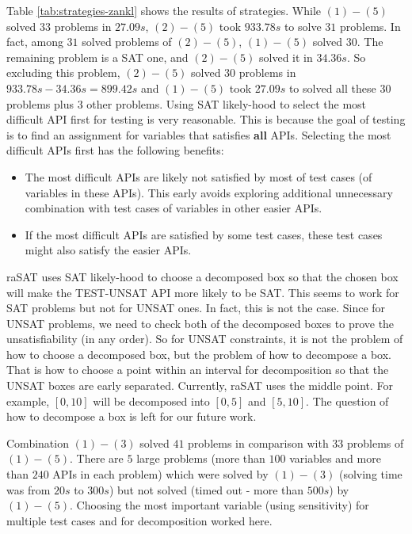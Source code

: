 \documentclass[runningheads,a4paper,oribibl]{llncs}
\begin{document}
 Table \ref{tab:strategies-zankl} shows the results of strategies. While $(1)-(5)$ solved $33$ problems in $27.09s$, $(2)-(5)$ took $933.78s$ to solve $31$ problems. In fact, among $31$ solved problems of $(2)-(5)$, $(1)-(5)$ solved $30$. The remaining problem is a SAT one, and $(2)-(5)$ solved it in $34.36s$. So excluding this problem, $(2)-(5)$ solved $30$ problems in $933.78s - 34.36s = 899.42s$ and $(1)-(5)$ took $27.09s$ to solved all these $30$ problems plus $3$ other problems. Using SAT likely-hood to select the most difficult API first for testing is very reasonable. This is because the goal of testing is to find an assignment for variables that satisfies \textbf{all} APIs. Selecting the most difficult APIs first has the following benefits: 
\begin{itemize}
  \item The most difficult APIs are likely not satisfied by most of test cases (of variables in these APIs). This early avoids exploring additional unnecessary combination with test cases of variables in other easier APIs.
  \item If the most difficult APIs are satisfied by some test cases, these test cases might also satisfy the easier APIs.
\end{itemize}

raSAT uses SAT likely-hood to choose a decomposed box so that the chosen box will make the TEST-UNSAT API more likely to be SAT. This seems to work for SAT problems but not for UNSAT ones. In fact, this is not the case. Since for UNSAT problems, we need to check both of the decomposed boxes to prove the unsatisfiability (in any order). So for UNSAT constraints, it is not the problem of how to choose a decomposed box, but the problem of how to decompose a box. That is how to choose a point within an interval for decomposition so that the UNSAT boxes are early separated. Currently, raSAT uses the middle point. For example, $[0, 10]$ will be decomposed into $[0, 5]$ and $[5, 10]$. The question of how to decompose a box is left for our future work.

Combination $(1)-(3)$ solved $41$ problems in comparison with $33$ problems of $(1)-(5)$. There are $5$ large problems (more than $100$ variables and more than $240$ APIs in each problem) which were solved by $(1)-(3)$ (solving time was from $20s$ to $300s$) but not solved (timed out - more than $500s$) by $(1)-(5)$. Choosing the most important variable (using sensitivity) for multiple test cases and for decomposition worked here.
\end{document}

